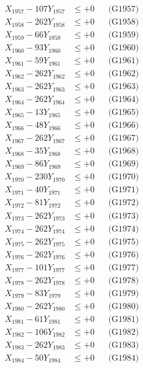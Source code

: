 \documentclass[a4paper,10pt]{article}
\begin{document}
{\begin{align}
X_{1957} - 107Y_{1957} &\leq +0 && \text{(G1957)} \\
X_{1958} - 262Y_{1958} &\leq +0 && \text{(G1958)} \\
X_{1959} - 66Y_{1959} &\leq +0 && \text{(G1959)} \\
X_{1960} - 93Y_{1960} &\leq +0 && \text{(G1960)} \\
\allowbreak
X_{1961} - 59Y_{1961} &\leq +0 && \text{(G1961)} \\
X_{1962} - 262Y_{1962} &\leq +0 && \text{(G1962)} \\
X_{1963} - 262Y_{1963} &\leq +0 && \text{(G1963)} \\
X_{1964} - 262Y_{1964} &\leq +0 && \text{(G1964)} \\
X_{1965} - 13Y_{1965} &\leq +0 && \text{(G1965)} \\
X_{1966} - 48Y_{1966} &\leq +0 && \text{(G1966)} \\
X_{1967} - 262Y_{1967} &\leq +0 && \text{(G1967)} \\
X_{1968} - 35Y_{1968} &\leq +0 && \text{(G1968)} \\
X_{1969} - 86Y_{1969} &\leq +0 && \text{(G1969)} \\
X_{1970} - 230Y_{1970} &\leq +0 && \text{(G1970)} \\
\allowbreak
X_{1971} - 40Y_{1971} &\leq +0 && \text{(G1971)} \\
X_{1972} - 81Y_{1972} &\leq +0 && \text{(G1972)} \\
X_{1973} - 262Y_{1973} &\leq +0 && \text{(G1973)} \\
X_{1974} - 262Y_{1974} &\leq +0 && \text{(G1974)} \\
X_{1975} - 262Y_{1975} &\leq +0 && \text{(G1975)} \\
X_{1976} - 262Y_{1976} &\leq +0 && \text{(G1976)} \\
X_{1977} - 101Y_{1977} &\leq +0 && \text{(G1977)} \\
X_{1978} - 262Y_{1978} &\leq +0 && \text{(G1978)} \\
X_{1979} - 83Y_{1979} &\leq +0 && \text{(G1979)} \\
X_{1980} - 262Y_{1980} &\leq +0 && \text{(G1980)} \\
\allowbreak
X_{1981} - 61Y_{1981} &\leq +0 && \text{(G1981)} \\
X_{1982} - 106Y_{1982} &\leq +0 && \text{(G1982)} \\
X_{1983} - 262Y_{1983} &\leq +0 && \text{(G1983)} \\
X_{1984} - 50Y_{1984} &\leq +0 && \text{(G1984)} \\

\end{align}}
\end{document}

